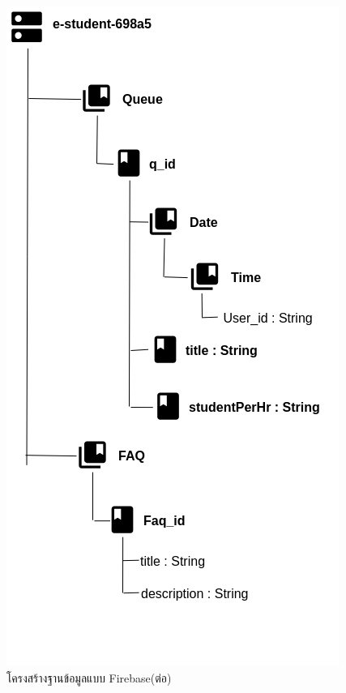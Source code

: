 	\begin{figure}[H]
	\centering
	\includegraphics[width=0.7\columnwidth]
	{Figures/3/DB/DB4}
	\caption{โครงสร้างฐานข้อมูลแบบ Firebase(ต่อ)}
	\label{Fig:DB4}
\end{figure}

